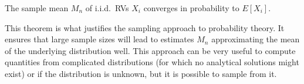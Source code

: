 \begin{prop}
The sample mean $M_n$ of i.i.d.~RVs $X_i$ converges in probability to $E[X_i]$.
\end{prop}
This theorem is what justifies the sampling approach to probability theory. It ensures that large sample sizes will lead to estimates $M_n$ approximating the mean of the underlying distribution well. This approach can be very useful to compute quantities from complicated distributions (for which no analytical solutions might exist) or if the distribution is unknown, but it is possible to sample from it.


